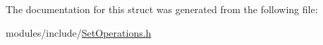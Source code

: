 The documentation for this struct was generated from the following file\+:\begin{DoxyCompactItemize}
\item 
modules/include/\mbox{\hyperlink{SetOperations_8h}{Set\+Operations.\+h}}\end{DoxyCompactItemize}
